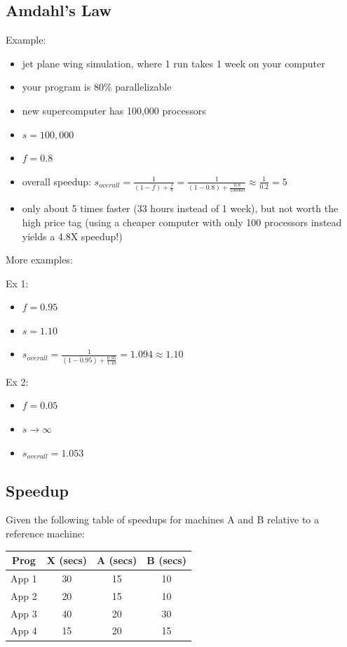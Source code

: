\documentclass[12pt]{article}
\begin{document}
    \subsection{Amdahl's Law}

    Example:

	\begin{itemize}
		\item jet plane wing simulation, where 1 run takes 1 week on your computer
		\item your program is 80\% parallelizable
		\item new supercomputer has 100,000 processors
		\item $s = 100,000$
		\item $f = 0.8$
		\item overall speedup: $s_{overall} = \frac{1}{(1 - f) + \frac{f}{s}} = \frac{1}{(1 - 0.8) + \frac{0.8}{100000}} \approx \frac{1}{0.2} = 5$
		\item only about 5 times faster (33 hours instead of 1 week), but not worth the high price tag (using a cheaper computer with only 100 processors instead yields a 4.8X speedup!)
	\end{itemize}

	More examples:

	Ex 1:

	\begin{itemize}
		\item $f = 0.95$
		\item $s = 1.10$
		\item $s_{overall} = \frac{1}{(1-0.95) + \frac{0.95}{1.10}} = 1.094 \approx 1.10$
	\end{itemize}

	Ex 2:

	\begin{itemize}
		\item $f = 0.05$
		\item $s \rightarrow \infty$
		\item $s_{overall} = 1.053$
	\end{itemize}

    \subsection{Speedup}

    Given the following table of speedups for machines A and B relative to a reference machine:

	\begin{tabular}[h!]{|c|c|c|c|} \hline
		Prog	& X (secs)	& A (secs)	& B	(secs)	\\ \hline
		App 1	& 30		& 15		& 10		\\ \hline
		App 2	& 20		& 15		& 10		\\ \hline
		App 3	& 40		& 20		& 30		\\ \hline
		App 4	& 15		& 20		& 15		\\ \hline
	\end{tabular}
\end{document}
